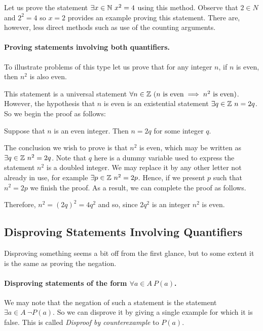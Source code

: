 Let us prove the statement $\exists x \in \mathbb{N} \ x^2 = 4$ using this method.
Observe that $2 \in N$ and $2^2 = 4$ so $x = 2$ provides an example proving
this statement. There are, however, less direct methods such as use of the
counting arguments.

\paragraph{Proving statements involving both quantifiers.}
To illustrate problems of this type let us prove that for any integer $n$, if
$n$ is even, then $n^2$ is also even.

This statement is a universal statement $\forall n \in \mathbb{Z} \ (n \text{ is even}
\implies n^2 \text{ is even})$. However, the hypothesis that $n$ is even is an
existential statement $\exists q \in \mathbb{Z} \ n = 2q$. So we begin the proof as
follows:
\begin{center}
  Suppose that $n$ is an even integer. Then $n = 2q$ for some integer $q$.
\end{center}
The conclusion we wish to prove is that $n^2$ is even, which may be written as
$\exists q \in \mathbb{Z} \ n^2 = 2q$. Note that $q$ here is a dummy variable used to
express the statement $n^2$ is a doubled integer. We may replace it by any
other letter not already in use, for example $\exists p \in \mathbb{Z} \ n^2 = 2p$.
Hence, if we present $p$ such that $n^2 = 2p$ we finish the proof. As a result,
we can complete the proof as follows.
\begin{center}
  Therefore, $n^2 = (2q)^2 = 4q^2$ and so, since $2q^2$ is an integer $n^2$ is
  even.
\end{center}

\subsection{Disproving Statements Involving Quantifiers}
Disproving something seems a bit off from the first glance, but to some extent
it is the same as proving the negation.

\paragraph{Disproving statements of the form $\forall a \in A \ P(a)$.}
We may note that the negation of such a statement is the statement $\exists a
\in A \ \lnot P(a)$. So we can disprove it by giving a single example for which
it is false. This is called \textit{Disproof by counterexample} to $P(a)$.

